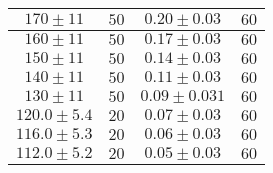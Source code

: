 \documentclass[@MAIN@]{subfile}
\begin{document}
\begin{tabular}{ ||c|c|c|c|| }
        \hline
        $170\pm 11$        & $50$                 & $0.20\pm 0.03$  & $60$             \\
        \hline
        $160\pm 11$        & $50$                 & $0.17\pm 0.03$  & $60$             \\
        \hline
        $150\pm 11$        & $50$                 & $0.14\pm 0.03$  & $60$             \\
        \hline
        $140\pm 11$        & $50$                 & $0.11\pm 0.03$  & $60$             \\
        \hline
        $130\pm 11$        & $50$                 & $0.09\pm 0.031$ & $60$             \\
        \hline
        $120.0\pm 5.4$     & $20$                 & $0.07\pm 0.03$  & $60$             \\
        \hline
        $116.0\pm 5.3$     & $20$                 & $0.06\pm 0.03$  & $60$             \\
        \hline
        $112.0\pm 5.2$     & $20$                 & $0.05\pm 0.03$  & $60$             \\
        \hline

    \end{tabular}
\end{document}
